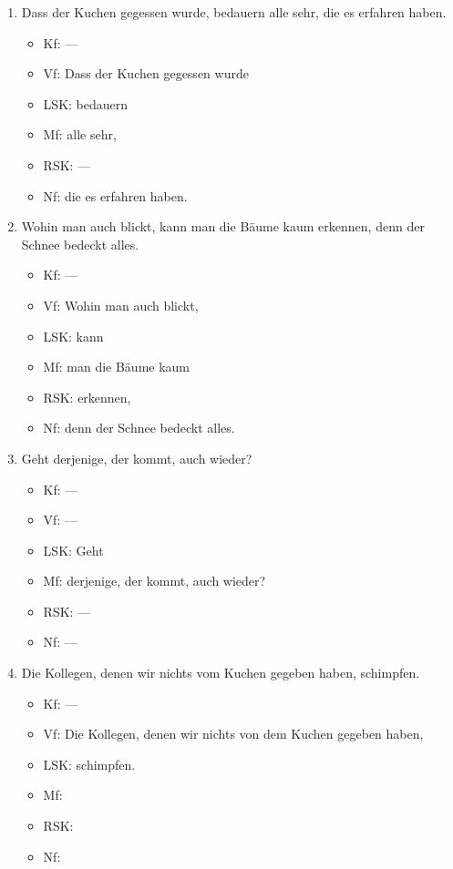 \begin{enumerate}\Lf
  \item Dass der Kuchen gegessen wurde, bedauern alle sehr, die es erfahren haben.
    \begin{itemize}\Lf
      \item Kf: ---
      \item Vf: Dass der Kuchen gegessen wurde
      \item LSK: bedauern
      \item Mf: alle sehr,
      \item RSK: ---
      \item Nf: die es erfahren haben.
    \end{itemize}
  \item Wohin man auch blickt, kann man die Bäume kaum erkennen, denn der Schnee bedeckt alles.
    \begin{itemize}\Lf
      \item Kf: ---
      \item Vf: Wohin man auch blickt,
      \item LSK: kann
      \item Mf: man die Bäume kaum
      \item RSK: erkennen,
      \item Nf: denn der Schnee bedeckt alles.
    \end{itemize}
  \item Geht derjenige, der kommt, auch wieder?
    \begin{itemize}\Lf
      \item Kf: ---
      \item Vf: ---
      \item LSK: Geht
      \item Mf: derjenige, der kommt, auch wieder?
      \item RSK: ---
      \item Nf: ---
    \end{itemize}
  \item Die Kollegen, denen wir nichts vom Kuchen gegeben haben, schimpfen.
    \begin{itemize}\Lf
      \item Kf: ---
      \item Vf: Die Kollegen, denen wir nichts von dem Kuchen gegeben haben,
      \item LSK: schimpfen.
      \item Mf: 
      \item RSK: 
      \item Nf: 

\end{itemize}
\end{enumerate}
